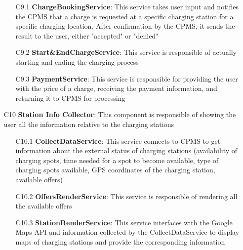 \documentclass[12pt]{report}
\begin{document}
\begin{itemize}
        \begin{itemize}
            \item [C9.1]\textbf{ChargeBookingService}: This service takes user input and notifies the CPMS that a charge is requested at a specific charging station for a specific charging location. After confirmation by the CPMS, it sends the result to the user, either "accepted" or "denied"
            \item [C9.2]\textbf{Start\&EndChargeService}: This service is responsible of actually starting and ending the charging process
            \item [C9.3]\textbf{PaymentService}: This service is responsible for providing the user with the price of a charge, receiving the payment information, and returning it to CPMS for processing
        \end{itemize}
    \item [C10] \textbf{Station Info Collector}: This component is responsible of showing the user all the information relative to the charging stations
        \begin{itemize}
            \item [C10.1]\textbf{CollectDataService}: This service connects to CPMS to get information about the external status of charging stations (availability of charging spots, time needed for a spot to become available, type of charging spots available, GPS coordinates of the charging station, available offers)
            \item [C10.2]\textbf{OffersRenderService}: This service is responsible of rendering all the available offers
            \item [C10.3]\textbf{StationRenderService}: This service interfaces with the Google Maps API and information collected by the CollectDataService to display maps of charging stations and provide the corresponding information
        \end{itemize}
\end{itemize}
\clearpage
\end{document}
